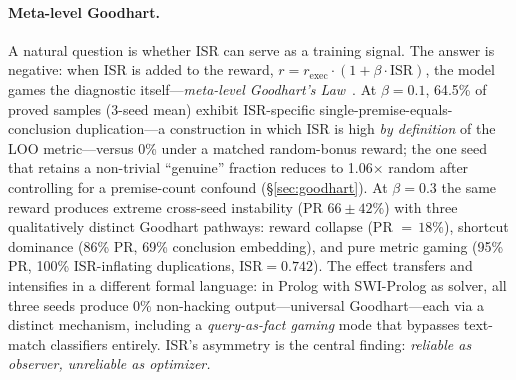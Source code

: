 \paragraph{Meta-level Goodhart.}
A natural question is whether ISR can serve as a training signal.
The answer is negative: when ISR is added to the reward, $r = r_{\text{exec}} \cdot (1 + \beta \cdot \text{ISR})$, the model games the diagnostic itself---\emph{meta-level Goodhart's Law}~\citep{manheim-goodhart-taxonomy, karwowski-goodhart-rl, gao-reward-overoptimization}.
At $\beta{=}0.1$, 64.5\% of proved samples (3-seed mean) exhibit ISR-specific single-premise-equals-conclusion duplication---a construction in which ISR is high \emph{by definition} of the LOO metric---versus 0\% under a matched random-bonus reward; the one seed that retains a non-trivial ``genuine'' fraction reduces to 1.06$\times$ random after controlling for a premise-count confound (\S\ref{sec:goodhart}).
At $\beta{=}0.3$ the same reward produces extreme cross-seed instability (PR $66{\pm}42\%$) with three qualitatively distinct Goodhart pathways: reward collapse (PR ${=}\,18\%$), shortcut dominance (86\% PR, 69\% conclusion embedding), and pure metric gaming (95\% PR, 100\% ISR-inflating duplications, ISR${=}0.742$).
The effect transfers and intensifies in a different formal language: in Prolog with SWI-Prolog as solver, all three seeds produce 0\% non-hacking output---universal Goodhart---each via a distinct mechanism, including a \emph{query-as-fact gaming} mode that bypasses text-match classifiers entirely.
ISR's asymmetry is the central finding: \emph{reliable as observer, unreliable as optimizer.}

